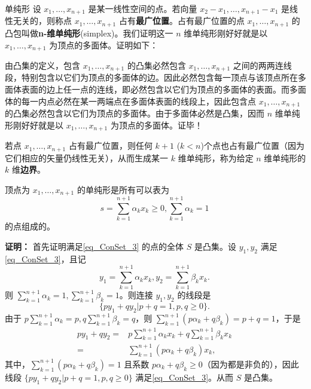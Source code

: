 \begin{example}{单纯形}
设 $x_1,\ldots,x_{n+1}$ 是某一线性空间的点。若向量 $x_2-x_1,\ldots,x_{n+1}-x_1$ 是线性无关的，则称点 $x_1,\ldots,x_{n+1}$ 占有\textbf{最广位置}。占有最广位置的点 $x_1,\ldots,x_{n+1}$ 的凸包叫做\textbf{n-维单纯形}(simplex)。我们证明这一 $n$ 维单纯形刚好好就是以 $x_1,\ldots,x_{n+1}$ 为顶点的多面体。证明如下：

由凸集的定义，包含 $x_1,\ldots,x_{n+1}$ 的凸集必然包含 $x_1,\ldots,x_{n+1}$ 之间的两两连线段，特别包含以它们为顶点的多面体的边。因此必然包含每一顶点与该顶点所在多面体表面的边上任一点的连线，即必然包含以它们为顶点的多面体的表面。而多面体的每一内点必然在某一两端点在多面体表面的线段上，因此包含点 $x_1,\ldots,x_{n+1}$ 的凸集必然包含以它们为顶点的多面体。由于多面体必然是凸集，因而
 $n$ 维单纯形刚好好就是以 $x_1,\ldots,x_{n+1}$ 为顶点的多面体。证毕！

若点 $x_1,\ldots,x_{n+1}$ 占有最广位置，则任何 $k+1$ ($k<n$)个点也占有最广位置（因为它们相应的矢量仍线性无关），从而生成某一 $k$ 维单纯形，称为给定 $n$ 维单纯形的 $k$ 维\textbf{边界}。
\end{example}

\begin{theorem}{}
顶点为  $x_1,\ldots,x_{n+1}$ 的单纯形是所有可以表为
\begin{equation}\label{eq_ConSet_3}
s=\sum_{k=1}^{n+1} \alpha_k x_k\geq0,\sum_{k=1}^{n+1}\alpha_k=1~
\end{equation}
的点组成的。
\end{theorem}

\textbf{证明：}
首先证明满足\autoref{eq_ConSet_3} 的点的全体 $S$ 是凸集。设 $y_1,y_2$ 满足\autoref{eq_ConSet_3}，且记
\begin{equation}
y_1=\sum_{k=1}^{n+1} \alpha_k x_k,y_2=\sum_{k=1}^{n+1} \beta_k x_k.~
\end{equation}
则 $\sum_{k=1}^{n+1}\alpha_k=1,\sum_{k=1}^{n+1}\beta_k=1$。则连接 $y_1,y_2$ 的线段是
\begin{equation}
\{py_1+qy_2|p+q=1,p,q\geq0\}.~
\end{equation}
由于 $p\sum_{k=1}^{n+1}\alpha_k=p,q\sum_{k=1}^{n+1}\beta_k=q$，则 $\sum_{k=1}^{n+1}(p\alpha_k +q\beta_k)=p+q=1$，于是
\begin{equation}
\begin{aligned}
py_1+qy_2=&p\sum_{k=1}^{n+1} \alpha_k x_k+q\sum_{k=1}^{n+1} \beta_k x_k\\
=&\sum_{k=1}^{n+1}(p\alpha_k +q\beta_k) x_k,
\end{aligned}~
\end{equation}
其中，$\sum_{k=1}^{n+1}(p\alpha_k +q\beta_k)=1$ 且系数 $p\alpha_k +q\beta_k\geq0$（因为都是非负的），因此线段 $\{py_1+qy_2|p+q=1,p,q\geq0\}$ 满足\autoref{eq_ConSet_3}。从而 $S$ 是凸集。

